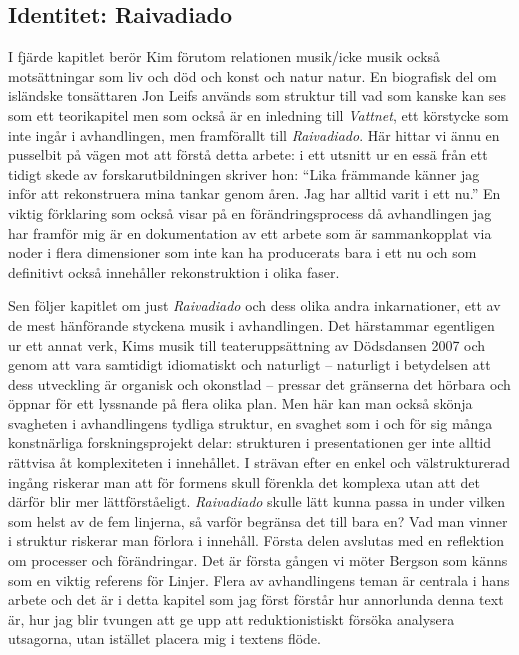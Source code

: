 \documentclass[a4paper]{article}
\begin{document}
\subsection*{Identitet: Raivadiado}

I fjärde kapitlet berör Kim förutom relationen musik/icke musik också motsättningar som liv och död och konst och natur natur. En biografisk del om isländske tonsättaren Jon Leifs används som struktur till vad som kanske kan ses som ett teorikapitel men som också är en inledning till \emph{Vattnet}, ett körstycke som inte ingår i avhandlingen, men framförallt till \emph{Raivadiado}. Här hittar vi ännu en pusselbit på vägen mot att förstå detta arbete: i ett utsnitt ur en essä från ett tidigt skede av forskarutbildningen skriver hon: ``Lika främmande känner jag inför att rekonstruera mina tankar genom åren. Jag har alltid varit i ett nu.'' En viktig förklaring som också visar på en förändringsprocess då avhandlingen jag har framför mig är en dokumentation av ett arbete som är sammankopplat via noder i flera dimensioner som inte kan ha producerats bara i ett nu och som definitivt också innehåller rekonstruktion i olika faser.

Sen följer kapitlet om just \emph{Raivadiado} och dess olika andra inkarnationer, ett av de mest hänförande styckena musik i avhandlingen. Det härstammar egentligen ur ett annat verk, Kims musik till teateruppsättning av Dödsdansen 2007 och genom att vara samtidigt idiomatiskt och naturligt -- naturligt i betydelsen att dess utveckling är organisk och okonstlad -- pressar det gränserna det hörbara och öppnar för ett lyssnande på flera olika plan. Men här kan man också skönja svagheten i avhandlingens tydliga struktur, en svaghet som i och för sig många konstnärliga forskningsprojekt delar: strukturen i presentationen ger inte alltid rättvisa åt komplexiteten i innehållet. I strävan efter en enkel och välstrukturerad ingång riskerar man att för formens skull förenkla det komplexa utan att det därför blir mer lättförståeligt. \emph{Raivadiado} skulle lätt kunna passa in under vilken som helst av de fem linjerna, så varför begränsa det till bara en? Vad man vinner i struktur riskerar man förlora i innehåll. Första delen avslutas med en reflektion om processer och förändringar. Det är första gången vi möter Bergson som känns som en viktig referens för Linjer. Flera av avhandlingens teman är centrala i hans arbete och det är i detta kapitel som jag först förstår hur annorlunda denna text är, hur jag blir tvungen att ge upp att reduktionistiskt försöka analysera utsagorna, utan istället placera mig i textens flöde. 
\end{document}
